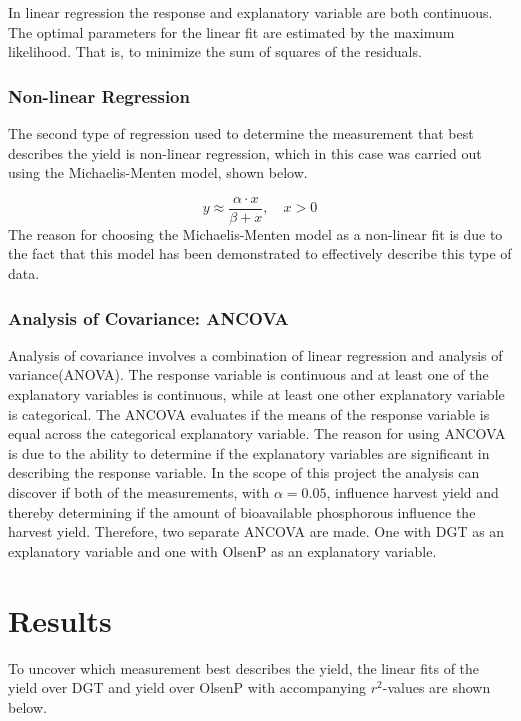 \documentclass[11pt, fleqn, titlepage]{article}
\begin{document}
\noindent
In linear regression the response and explanatory variable are both continuous. The optimal parameters for the linear fit are estimated by the maximum likelihood. That is, to minimize the sum of squares of the residuals. \cite{statbog} 

\subsubsection*{Non-linear Regression}
The second type of regression used to determine the measurement that best describes the yield is non-linear regression, which in this case was carried out using the Michaelis-Menten model, shown below.

\[y \approx \frac{\alpha \cdot x}{\beta + x}, \quad x > 0 \]
\noindent
The reason for choosing the Michaelis-Menten model as a non-linear fit is due to the fact that this model has been demonstrated to effectively describe this type of data. 

\subsubsection*{Analysis of Covariance: ANCOVA}
Analysis of covariance involves a combination of linear regression and analysis of variance(ANOVA). The response variable is continuous and at least one of the explanatory variables is continuous, while at least one other explanatory variable is categorical. The ANCOVA evaluates if the means of the response variable is equal across the categorical explanatory variable. The reason for using ANCOVA is due to the ability to determine if the explanatory variables are significant in describing the response variable. In the scope of this project the analysis can discover if both of the measurements, with $ \alpha = 0.05 $, influence harvest yield and thereby determining if the amount of bioavailable phosphorous influence the harvest yield. Therefore, two separate ANCOVA are made. One with DGT as an explanatory variable and one with OlsenP as an explanatory variable.   \cite{statbog} 


\section{Results}

To uncover which measurement best describes the yield, the linear fits of the yield over DGT and yield over OlsenP with accompanying $r^2$-values are shown below.
\end{document}
